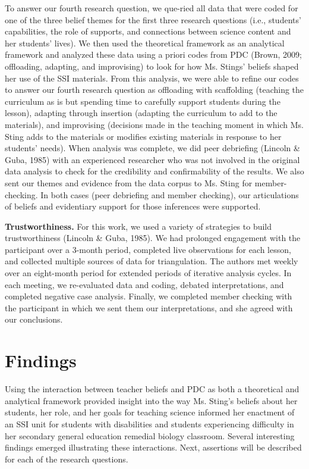 \documentclass[11.5pt]{sig-alternate}
\begin{document}
\begin{large}
To answer our fourth research question, we que-ried all data that were coded for one of the three belief themes for the first three research questions (i.e., students’ capabilities, the role of supports, and connections between science content and her students’ lives). We then used the theoretical framework as an analytical framework and analyzed these data using a priori codes from PDC (Brown, 2009; offloading, adapting, and improvising) to look for how Ms. Stings’ beliefs shaped her use of the SSI materials. From this analysis, we were able to refine our codes to answer our fourth research question as offloading with scaffolding (teaching the curriculum as is but spending time to carefully support students during the lesson), adapting through insertion (adapting the curriculum to add to the materials), and improvising (decisions made in the teaching moment in which Ms. Sting adds to the materials or modifies existing materials in response to her students’ needs). When analysis was complete, we did peer debriefing (Lincoln \& Guba, 1985) with an experienced researcher who was not involved in the original data analysis to check for the credibility and confirmability of the results. We also sent our themes and evidence from the data corpus to Ms. Sting for member-checking. In both cases (peer debriefing and member checking), our articulations of beliefs and evidentiary support for those inferences were supported.

\textbf{Trustworthiness.} For this work, we used a variety of strategies to build trustworthiness (Lincoln \& Guba, 1985). We had prolonged engagement with the participant over a 3-month period, completed live observations for each lesson, and collected multiple sources of data for triangulation. The authors met weekly over an eight-month period for extended periods of iterative analysis cycles. In each meeting, we re-evaluated data and coding, debated interpretations, and completed negative case analysis. Finally, we completed member checking with the participant in which we sent them our interpretations, and she agreed with our conclusions.

\section*{Findings}

Using the interaction between teacher beliefs and PDC as both a theoretical and analytical framework provided insight into the way Ms. Sting’s beliefs about her students, her role, and her goals for teaching science informed her enactment of an SSI unit for students with disabilities and students experiencing difficulty in her secondary general education remedial biology classroom. Several interesting findings emerged illustrating these interactions. Next, assertions will be described for each of the research questions.


\end{large}
\end{document}

